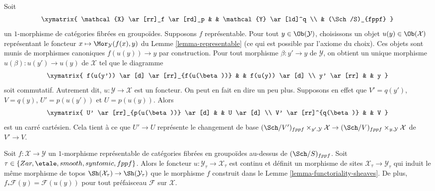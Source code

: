 \noindent
Soit
$$
\xymatrix{
\mathcal{X} \ar[rr]_f \ar[rd]_p & &  \mathcal{Y} \ar[ld]^q \\
& (\Sch/S)_{fppf}
}
$$
un $1$-morphisme de catégories fibrées en groupoïdes. Supposons $f$
représentable. Pour tout $y \in \Ob(\mathcal{Y})$, choisissons
un objet $u(y) \in \Ob(\mathcal{X})$ représentant le foncteur
$x \mapsto \Mor_\mathcal{Y}(f(x), y)$ du
Lemme \ref{lemma-representable}
(ce qui est possible par l'axiome du choix).
Ces objets sont munis de morphismes canoniques $f(u(y)) \to y$ par
construction.
Pour tout morphisme $\beta : y' \to y$ de $\mathcal{Y}$, on obtient un unique
morphisme $u(\beta) : u(y') \to u(y)$ de $\mathcal{X}$ tel que le diagramme
$$
\xymatrix{
f(u(y')) \ar[d] \ar[rr]_{f(u(\beta))} & & f(u(y)) \ar[d] \\
y' \ar[rr] & & y
}
$$
soit commutatif. Autrement dit, $u : \mathcal{Y} \to \mathcal{X}$ est un foncteur.
On peut en fait en dire un peu plus. Supposons en effet que
$V' = q(y')$, $V = q(y)$, $U' = p(u(y'))$ et $U = p(u(y))$. Alors
$$
\xymatrix{
U' \ar[rr]_{p(u(\beta))} \ar[d] & & U \ar[d] \\
V' \ar[rr]^{q(\beta)} & & V
}
$$
est un carré cartésien. Cela tient à ce que $U' \to U$ représente
le changement de base
$(\Sch/V')_{fppf} \times_{y', \mathcal{Y}} \mathcal{X} \to
(\Sch/V)_{fppf} \times_{y, \mathcal{Y}} \mathcal{X}$
de $V' \to V$.

\begin{lemma}
\label{lemma-representable-pushforward}
Soit $f : \mathcal{X} \to \mathcal{Y}$ un $1$-morphisme représentable de
catégories fibrées en groupoïdes au-dessus de $(\Sch/S)_{fppf}$. Soit
$\tau \in \{Zar, \etale, smooth, syntomic, fppf\}$.
Alors le foncteur $u : \mathcal{Y}_\tau \to \mathcal{X}_\tau$ est continu
et définit un morphisme de sites $\mathcal{X}_\tau \to \mathcal{Y}_\tau$
qui induit le même morphisme de topos
$\Sh(\mathcal{X}_\tau) \to \Sh(\mathcal{Y}_\tau)$
que le morphisme $f$ construit dans le
Lemme \ref{lemma-functoriality-sheaves}.
De plus, $f_*\mathcal{F}(y) = \mathcal{F}(u(y))$ pour tout préfaisceau
$\mathcal{F}$ sur $\mathcal{X}$.
\end{lemma}


